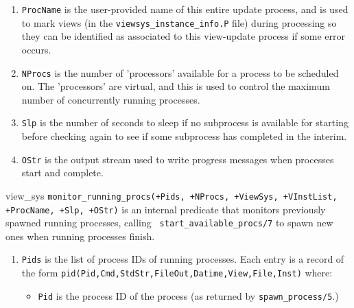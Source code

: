 \begin{description}
\begin{enumerate}
\begin{itemize}
\item {\tt View} is the view the process is generating.

\item @var(File) is the name of the output file to contain the
contents of the view instance.

\item {\tt Inst} is the instance of the view the process is generating.

\end{itemize}

\item {\tt ProcName} is the user-provided name of this entire update
process, and is used to mark views (in the
{\tt viewsys\_instance\_info.P} file) during processing so they can be
identified as associated to this view-update process if some error
occurs.

\item {\tt NProcs} is the number of 'processors' available for a
process to be scheduled on.  The 'processors' are virtual, and this is
used to control the maximum number of concurrently running processes.

\item {\tt Slp} is the number of seconds to sleep if no subprocess is
available for starting before checking again to see if some subprocess
has completed in the interim.

\item {\tt OStr} is the output stream used to write progress messages
when processes start and complete.

\end{enumerate}

{view\_sys}
%
{\tt monitor\_running\_procs(+Pids, +NProcs, +ViewSys, +VInstList,
  +ProcName, +Slp, +OStr)} is an internal predicate that monitors
previously spawned running processes, calling {\tt
  start\_available\_procs/7} to spawn new ones when running processes
finish.

\begin{enumerate}

\item {\tt Pids} is the list of process IDs of running processes.
Each entry is a record of the form
{\tt pid(Pid,Cmd,StdStr,FileOut,Datime,View,File,Inst)} where:

\begin{itemize}

\item {\tt Pid} is the process ID of the process (as returned by
{\tt spawn\_process/5}.)


\end{itemize}
\end{enumerate}
\end{description}
